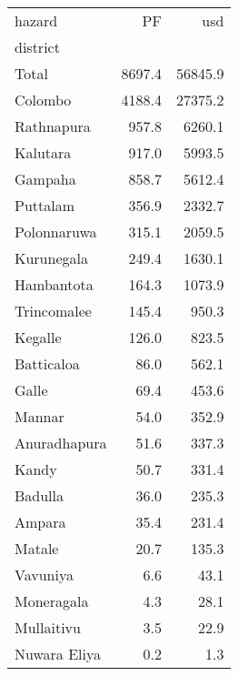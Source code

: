 \begin{tabular}{lrr}
\toprule
hazard &      PF &      usd \\
district     &         &          \\
\midrule
Total        &  8697.4 &  56845.9 \\
Colombo      &  4188.4 &  27375.2 \\
Rathnapura   &   957.8 &   6260.1 \\
Kalutara     &   917.0 &   5993.5 \\
Gampaha      &   858.7 &   5612.4 \\
Puttalam     &   356.9 &   2332.7 \\
Polonnaruwa  &   315.1 &   2059.5 \\
Kurunegala   &   249.4 &   1630.1 \\
Hambantota   &   164.3 &   1073.9 \\
Trincomalee  &   145.4 &    950.3 \\
Kegalle      &   126.0 &    823.5 \\
Batticaloa   &    86.0 &    562.1 \\
Galle        &    69.4 &    453.6 \\
Mannar       &    54.0 &    352.9 \\
Anuradhapura &    51.6 &    337.3 \\
Kandy        &    50.7 &    331.4 \\
Badulla      &    36.0 &    235.3 \\
Ampara       &    35.4 &    231.4 \\
Matale       &    20.7 &    135.3 \\
Vavuniya     &     6.6 &     43.1 \\
Moneragala   &     4.3 &     28.1 \\
Mullaitivu   &     3.5 &     22.9 \\
Nuwara Eliya &     0.2 &      1.3 \\
\bottomrule
\end{tabular}
